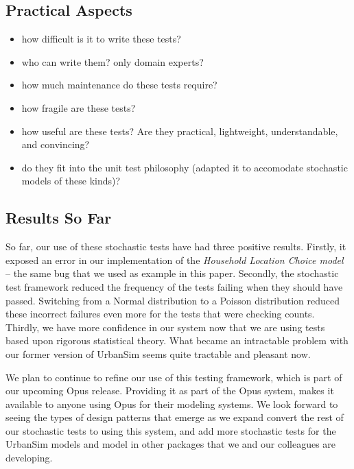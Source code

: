 \subsection{Practical Aspects}

\begin{itemize}
  \item how difficult is it to write these tests?
  \item who can write them?  only domain experts? 
  \item how much maintenance do these tests require?
  \item how fragile are these tests?
  \item how useful are these tests?  Are they practical, lightweight, 
     understandable, and convincing?
  \item do they fit into the unit test philosophy (adapted it to accomodate
  stochastic models of these kinds)?
\end{itemize}

\subsection{Results So Far}

So far, our use of these stochastic tests have had three positive results. 
Firstly, it exposed an error in our implementation of the \emph{Household Location 
Choice model} -- the same bug that we used as example in this paper.  Secondly, 
the stochastic test framework reduced the frequency of the tests failing when 
they should have passed.  Switching from a Normal distribution to a Poisson 
distribution reduced these incorrect failures even more for the tests that were 
checking counts. Thirdly, we have more confidence in our system now that we are 
using tests based upon rigorous statistical theory.  What became an intractable
problem with our former version of UrbanSim seems quite tractable and pleasant now.

We plan to continue to refine our use of this testing framework, which is part 
of our upcoming Opus release.  Providing it as part of the Opus system, makes 
it available to anyone using Opus for their modeling systems. We look forward 
to seeing the types of design patterns that emerge as we expand convert the 
rest of our stochastic tests to using this system, and add more stochastic 
tests for the UrbanSim models and model in other packages that we and our 
colleagues are developing.



